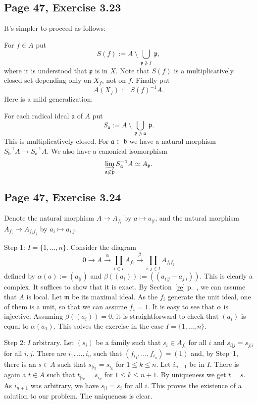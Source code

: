 \documentclass[parskip=half,fontsize=12pt]{scrartcl}%
\newcommand{\mf}{\mathfrak}
\newcommand{\ppp}{\mf p}
\newcommand{\xr}{\xrightarrow}
\begin{document}
\subsection{Page 47, Exercise 3.23}%

It's simpler to proceed as follows:

For $f\in A$ put 
$$
S(f):=A\ \setminus\ \bigcup_{\ppp\notni f}\ \ppp,
$$ 
where it is understood that $\ppp$ is in $X$. Note that $S(f)$ is a multiplicatively closed set depending only on $X_f$, not on $f$. Finally put 
$$
A(X_f):=S(f)^{-1}A.
$$ 
Here is a mild generalization: 

For each radical ideal $\mf a$ of $A$ put 
$$
S_{\mf a}:=A\ \setminus\ \bigcup_{\ppp\not\supset\mf a}\ \ppp.
$$ 
This is multiplicatively closed. For $\mf a\subset\mf b$ we have a natural morphism $S_{\mf b}^{-1}A\to S_{\mf a}^{-1}A$. We also have a canonical isomorphism 
$$
\varinjlim_{\mf a\not\subset\ppp}S_{\mf a}^{-1}A\simeq A_\ppp.
$$

\subsection{Page 47, Exercise 3.24}%

Denote the natural morphism $A\to A_{f_i}$ by $a\mapsto a_{|i}$, and the natural morphism $A_{f_i}\to A_{f_if_j}$ by $a_i\mapsto a_{i|j}$. 

Step 1: $I=\{1,\dots,n\}$. Consider the diagram 
$$
0\to A\xr\alpha\prod_{i\in I}A_{f_i}\xr\beta\prod_{i,j\in I}A_{f_if_j}
$$ 
defined by $\alpha(a):=(a_{|i})$ and $\beta((a_i)):=((a_{i|j}-a_{j|i}))$. This is clearly a complex. It suffices to show that it is exact. By Section~\ref{re} p.~\pageref{re}, we can assume that $A$ is local. Let $\mf m$ be its maximal ideal. As the $f_i$ generate the unit ideal, one of them is a unit, so that we can assume $f_1=1$. It is easy to see that $\alpha$ is injective. Assuming $\beta((a_i))=0$, it is straightforward to check that $(a_i)$ is equal to $\alpha(a_1)$. This solves the exercise in the case $I=\{1,\dots,n\}$.

Step 2: $I$ arbitrary. Let $(s_i)$ be a family such that $s_i\in A_{f_i}$ for all $i$ and $s_{i|j}=s_{j|i}$ for all $i,j$. There are $i_1,\dots,i_n$ such that $(f_{i_1},\dots,f_{i_n})=(1)$ and, by Step~1, there is an $s\in A$ such that $s_{|i_k}=s_{i_k}$ for $1\le k\le n$. Let $i_{n+1}$ be in $I$. There is again a $t\in A$ such that $t_{|i_k}=s_{i_k}$ for $1\le k\le n+1$. By uniqueness we get $t=s$. As $i_{n+1}$ was arbitrary, we have $s_{|i}=s_i$ for all $i$. This proves the existence of a solution to our problem. The uniqueness is clear.
\end{document}
